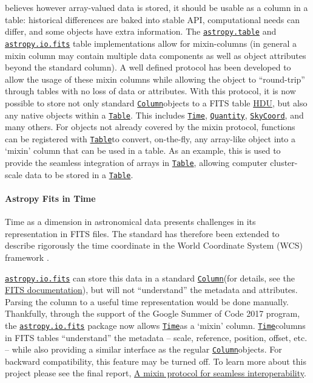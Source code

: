 \documentclass[modern]{aastex631}
\newcommand{\astropysubpkg}[1]{\href{http://docs.astropy.org/en/stable/#1/index.html}{\texttt{astropy.#1}}\xspace}
\newcommand{\astropyiosubpkg}[1]{\href{http://docs.astropy.org/en/stable/io/#1/index.html}{\texttt{astropy.io.#1}}\xspace}
\newcommand{\astropytable}{\astropysubpkg{table}}
\newcommand{\astropyfits}{\astropyiosubpkg{fits}}
\newcommand{\astropyapi}[2]{\href{https://docs.astropy.org/en/stable/api/astropy.#1.html}{#2}}
\newcommand{\astropyapidoc}[2]{\astropyapi{#1}{\texttt{#2}\xspace}}
\newcommand{\astropySkyCoord}{\astropyapidoc{coordinates.SkyCoord}{SkyCoord}}
\newcommand{\astropyFitsColumn}{\astropyapidoc{io.fits.Column}{Column}}
\newcommand{\astropyTableColumn}{\astropyapidoc{table.Column}{Column}}
\newcommand{\astropyTable}{\astropyapidoc{table.Table}{Table}}
\newcommand{\astropyTime}{\astropyapidoc{time.Time}{Time}}
\newcommand{\astropyQuantity}{\astropyapidoc{units.Quantity}{Quantity}}
\begin{document}
    \astropy believes however array-valued data is stored, it should be usable
    as a column in a table: historical differences are baked into stable API,
    computational needs can differ, and some objects have extra information. The
    \astropytable and \astropyfits table implementations allow for mixin-columns
    (in general a mixin column may contain multiple data components as well as
    object attributes beyond the standard column). A well defined protocol has
    been developed to allow the usage of these mixin columns while allowing the
    object to ``round-trip'' through tables with no loss of data or attributes.
    With this protocol, it is now possible to store not only standard
    \astropyTableColumn objects to a FITS table
    \href{https://docs.astropy.org/en/stable/io/fits/api/hdus.html}{HDU}, but
    also any \astropy native objects within a \astropyTable. This includes
    \astropyTime, \astropyQuantity, \astropySkyCoord, and many others. For
    objects not already covered by the mixin protocol, functions can be
    registered with \astropyTable to convert, on-the-fly, any array-like object
    into a `mixin' column that can be used in a table. As an example, this is
    used to provide the seamless integration of  arrays in
    \astropyTable, allowing computer cluster-scale data to be stored in a
    \astropyTable.

  \paragraph{Astropy Fits in Time}

    Time as a dimension in astronomical data presents challenges in its
    representation in FITS files. The standard has therefore been extended to
    describe rigorously the time coordinate in the World Coordinate System (WCS)
    framework \citep{FITS-Time:2015}.

    \astropyfits can store this data in a standard \astropyFitsColumn (for
    details, see the
    \href{https://docs.astropy.org/en/stable/io/fits/index.html}{FITS
    documentation}), but will not ``understand'' the metadata and attributes.
    Parsing the column to a useful time representation would be done manually.
    Thankfully, through the support of the Google Summer of Code 2017 program,
    the \astropyfits package now allows \astropyTime as a `mixin' column.
    \astropyTime columns in FITS tables ``understand'' the metadata -- scale,
    reference, position, offset, etc. -- while also providing a similar
    interface as the regular \astropyFitsColumn objects. For backward
    compatibility, this feature may be turned off. To learn more about this
    project please see the final report,
    \href{https://aaryapatil.wordpress.com/2017/08/28/a-mixin-protocol-for-seamless-interoperability/}{A
    mixin protocol for seamless interoperability}.
\end{document}
